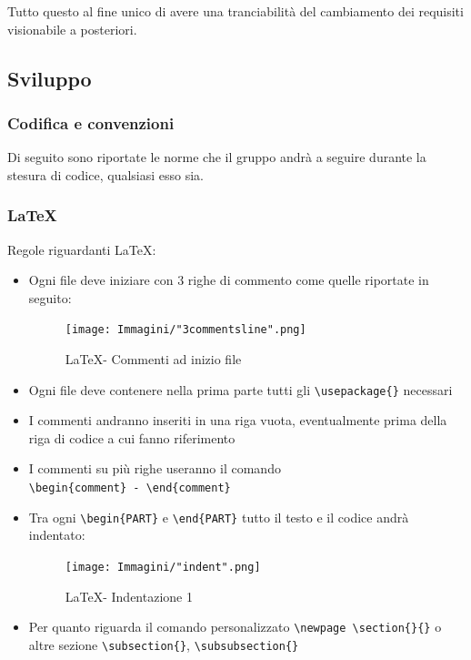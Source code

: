 \documentclass[a4paper]{article}
\begin{document}
		Tutto questo al fine unico di avere una tranciabilità del cambiamento dei requisiti visionabile a posteriori.
		\subsection{Sviluppo}
		\subsubsection{Codifica e convenzioni}
		Di seguito sono riportate le norme che il gruppo andrà a seguire durante la stesura di codice, qualsiasi esso sia.
		\subsubsection{\LaTeX}
		Regole riguardanti \LaTeX :
		\begin{itemize}
			\item Ogni file deve iniziare con 3 righe di commento come quelle riportate in seguito:
			\begin{figure}[H]
				\centering
				\texttt{[image: Immagini/"3commentsline".png]}
				\caption{\LaTeX \space - Commenti ad inizio file}
			\end{figure}
			\item Ogni file deve contenere nella prima parte tutti gli \verb|\usepackage{}| necessari
			\item I commenti andranno inseriti in una riga vuota, eventualmente prima della riga di
			codice a cui fanno riferimento
			\item I commenti su più righe useranno il comando \\ \verb|\begin{comment} - \end{comment}|
			\item Tra ogni \verb|\begin{PART}| e \verb|\end{PART}| tutto il testo e il codice andrà indentato:
			\begin{figure}[H]
				\centering
				\texttt{[image: Immagini/"indent".png]}
				\caption{\LaTeX \space - Indentazione 1}
			\end{figure}
			\item Per quanto riguarda il comando personalizzato \verb|\newpage \section{}{}| o altre sezione \verb|\subsection{}|, \verb|\subsubsection{}|

\end{itemize}
\end{document}
